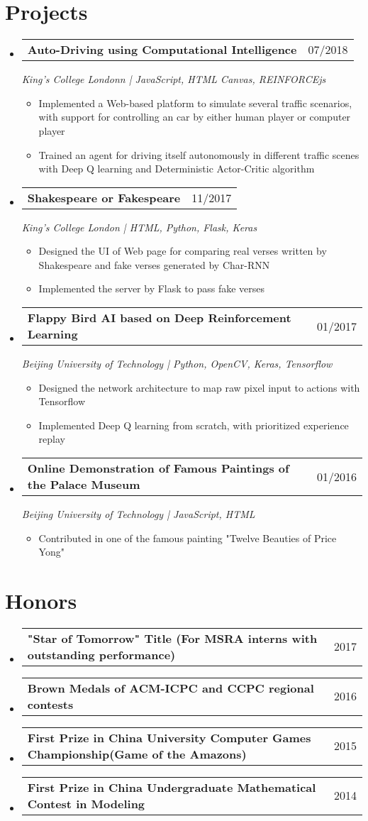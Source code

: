 \documentclass[a4paper,11pt]{article}
\makeatletter
\newcommand{\resumeItem}[1]{
  \item\small{#1 \vspace{-2pt}}
}
\newcommand{\resumeSubheading}[3]{
  \vspace{-1pt}\item
    \begin{tabular*}{0.97\textwidth}{l@{\extracolsep{\fill}}r}
      \textbf{#1} & #2
      \end{tabular*}
      \textit{\small#3}
}
\newcommand{\resumeMiniheading}[2]{
  \vspace{-1pt}\item
    \begin{tabular*}{0.97\textwidth}{l@{\extracolsep{\fill}}r}
      \textbf{#1} & #2
    \end{tabular*}
}
\newcommand{\resumeItemListStart}{\begin{itemize}[leftmargin=*, topsep=0ex]}
\newcommand{\resumeItemListEnd}{\end{itemize}}
\makeatother
\begin{document}
\section{Projects}
  \begin{itemize}[leftmargin=*, itemsep=5pt, label={}]
    \resumeSubheading{Auto-Driving using Computational Intelligence}{07/2018}{King's College Londonn \textnormal{|} JavaScript, HTML Canvas, REINFORCEjs}
      \resumeItemListStart
        \resumeItem {Implemented a Web-based platform to simulate several traffic scenarios, with support for controlling an car by either human player or computer player}
        \resumeItem {Trained an agent for driving itself autonomously in different traffic scenes with Deep Q learning and Deterministic Actor-Critic algorithm}
      \resumeItemListEnd
    
    \resumeSubheading{Shakespeare or Fakespeare}{11/2017}
    {King's College London \textnormal{|} HTML, Python, Flask, Keras}
      \resumeItemListStart
        \resumeItem {Designed the UI of Web page for comparing real verses written by Shakespeare and fake verses generated by Char-RNN}
        \resumeItem {Implemented the server by Flask to pass fake verses}
      \resumeItemListEnd

    \resumeSubheading{Flappy Bird AI based on Deep Reinforcement Learning}{01/2017}
    {Beijing University of Technology \textnormal{|} Python, OpenCV, Keras, Tensorflow}
        \resumeItemListStart
            \resumeItem {Designed the network architecture to map raw pixel input to actions with Tensorflow}
            \resumeItem {Implemented Deep Q learning from scratch, with prioritized experience replay}
        \resumeItemListEnd
  
    \resumeSubheading{Online Demonstration of Famous Paintings of the Palace Museum}{01/2016}{Beijing University of Technology \textnormal{|} JavaScript, HTML}
        \resumeItemListStart
          \resumeItem {Contributed in one of the famous painting "Twelve Beauties of Price Yong"}
        \resumeItemListEnd
        
  \end{itemize}

\section{Honors}
  \begin{itemize}[leftmargin=*, itemsep=-1pt, label={}]
    \resumeMiniheading{"Star of Tomorrow" Title {\normalfont(For MSRA interns with outstanding performance)}}{2017}
    \resumeMiniheading{Brown Medals of ACM-ICPC and CCPC regional contests}{2016}
    \resumeMiniheading{First Prize in China University Computer Games Championship(Game of the Amazons)}{2015}
    \resumeMiniheading{First Prize in China Undergraduate Mathematical Contest in Modeling}{2014}
  \end{itemize}
\end{document}
